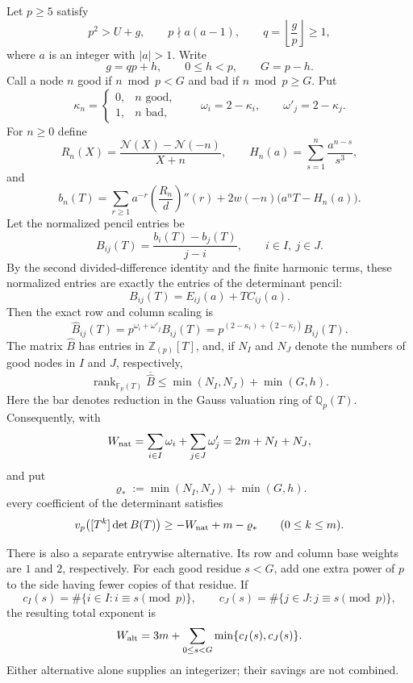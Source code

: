 \begin{lemma}
\label{lem:residue-copy-rank-insert}
Let $p\geq5$ satisfy
\[
 p^2>U+g,
 \qquad p\nmid a(a-1),
 \qquad q=\left\lfloor\frac gp\right\rfloor\geq1,
\]
where $a$ is an integer with $|a|>1$.  Write
\[
 g=qp+h,\qquad 0\leq h<p,\qquad G=p-h.
\]
Call a node $n$ good if $n\bmod p<G$ and bad if
$n\bmod p\geq G$.  Put
\[
 \kappa_n=\begin{cases}0,&n\text{ good},\\1,&n\text{ bad},\end{cases}
 \qquad
 \omega_i=2-\kappa_i,\qquad \omega'_j=2-\kappa_j.
\]
For $n\geq0$ define
\[
 R_n(X)=\frac{\mathcal N(X)-\mathcal N(-n)}{X+n},
 \qquad
 H_n(a)=\sum_{s=1}^{n}\frac{a^{n-s}}{s^3},
\]
and
\begin{equation}
 b_n(T)=\sum_{r\geq1}a^{-r}\left(\frac{R_n}{d}\right)''(r)
       +2w(-n)\bigl(a^nT-H_n(a)\bigr).
 \label{eq:insert-bn}
\end{equation}
Let the normalized pencil entries be
\begin{equation}
 B_{ij}(T)=\frac{b_i(T)-b_j(T)}{j-i},
 \qquad i\in I,\ j\in J.
 \label{eq:insert-Bij}
\end{equation}
By the second divided-difference identity and the finite harmonic terms,
these normalized entries are exactly the entries of the determinant pencil:
\[
 B_{ij}(T)=E_{ij}(a)+TC_{ij}(a).
\]
Then the exact row and column scaling is
\begin{equation}
 \widehat B_{ij}(T)=p^{\omega_i+\omega'_j}B_{ij}(T)
 =p^{(2-\kappa_i)+(2-\kappa_j)}B_{ij}(T).
 \label{eq:insert-scaled-B}
\end{equation}
The matrix $\widehat B$ has entries in $\mathbb Z_{(p)}[T]$, and, if
$N_I$ and $N_J$ denote the numbers of good nodes in $I$ and $J$, respectively,
\begin{equation}
 \operatorname{rank}_{\mathbb F_p(T)}\overline{\widehat B}
 \leq \min(N_I,N_J)+\min(G,h).
 \label{eq:insert-rank-bound}
\end{equation}
Here the bar denotes reduction in the Gauss valuation ring of
$\mathbb Q_p(T)$.  Consequently, with
\[
 W_{\rm nat}=\sum_{i\in I}\omega_i+\sum_{j\in J}\omega'_j
             =2m+N_I+N_J,
\]
and put
\[
 \varrho_*:=\min(N_I,N_J)+\min(G,h).
\]
every coefficient of the determinant satisfies
\begin{equation}
 v_p\!\left([T^k]\det B(T)\right)
 \geq -W_{\rm nat}+m-\varrho_*
 \qquad(0\leq k\leq m).
 \label{eq:insert-rank-valuation}
\end{equation}

There is also a separate entrywise alternative.  Its row and column base
weights are $1$ and $2$, respectively.  For each good residue $s<G$, add one
extra power of $p$ to the side having fewer copies of that residue.  If
\[
 c_I(s)=\#\{i\in I:i\equiv s\pmod p\},\qquad
 c_J(s)=\#\{j\in J:j\equiv s\pmod p\},
\]
the resulting total exponent is
\begin{equation}
 W_{\rm alt}=3m+\sum_{0\leq s<G}\min\{c_I(s),c_J(s)\}.
 \label{eq:insert-W-alt}
\end{equation}
Either alternative alone supplies an integerizer; their savings are not
combined.
\end{lemma}

